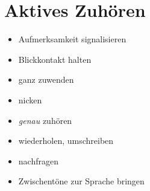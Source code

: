 \section{Aktives Zuhören}
\label{aktives-zuhoeren}

\begin{itemize}
  \item Aufmerksamkeit signalisieren
  \item Blickkontakt halten
  \item ganz zuwenden
  \item nicken
  \item \emph{genau} zuhören
  \item wiederholen, umschreiben
  \item nachfragen
  \item \glqq Zwischentöne\grqq{} zur Sprache bringen
\end{itemize}
